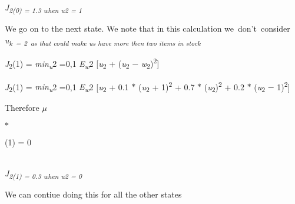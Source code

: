 \documentclass[12pt,twoside]{article}
\begin{document}
{\fontsize{10pt}{12.0pt}\selectfont \textit{J\textsubscript{2(0) = 1.3 when u2 = 1}}\par}\par


\vspace{\baselineskip}
{\fontsize{10pt}{12.0pt}\selectfont We go on to the next state. We note that in this calculation we\  don’t\ consider  \textit{u\textsubscript{k\  = 2\ as that could make  us have more then two items in stock}}\par}\par


\vspace{\baselineskip}
\begin{Center}
{\fontsize{10pt}{12.0pt}\selectfont \textit{J}\textsubscript{2}(1) = \textit{min\textsubscript{u}}2 =0,1 \textit{E\textsubscript{w}}2 [\textit{u}\textsubscript{2} + (\textit{u}\textsubscript{2} $-$  \textit{w}\textsubscript{2})\textsuperscript{2}]\par}
\end{Center}\par

\begin{Center}
{\fontsize{10pt}{12.0pt}\selectfont \textit{J}\textsubscript{2}(1) = \textit{min\textsubscript{u}}2 =0,1 \textit{E\textsubscript{w}}2 [\textit{u}\textsubscript{2} + 0.1 $\ast$  (\textit{u}\textsubscript{2} + 1)\textsuperscript{2} + 0.7 $\ast$  (\textit{u}\textsubscript{2})\textsuperscript{2} + 0.2 $\ast$  (\textit{u}\textsubscript{2} $-$  1)\textsuperscript{2}]\par}
\end{Center}\par


\vspace{\baselineskip}

\vspace{\baselineskip}

\vspace{\baselineskip}
Therefore \textit{$ \mu $ }{\fontsize{7pt}{8.4pt}$\ast$  \par}(1) = 0\par

{\fontsize{10pt}{12.0pt}\selectfont \\
\textit{J\textsubscript{2(1) = 0.3 when u2 = 0}}\par}\par


\vspace{\baselineskip}
{\fontsize{10pt}{12.0pt}\selectfont We can contiue doing this for all the other states\par}\par
\end{document}
